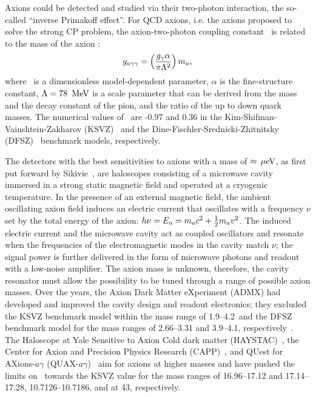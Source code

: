 Axions could be detected and studied via their two-photon interaction, the
so-called ``inverse Primakoff effect''. For QCD axions, i.e. the axions 
proposed to solve the strong CP problem, the axion-two-photon coupling 
constant \bgagg\ is related to the mass of the axion \ma: 
\begin{equation}
 g_{a\gamma\gamma} = \left(\frac{g_{\gamma}\alpha}{\pi \Lambda^2}\right)m_a, 
\label{eq:grelation}
\end{equation}
where \bggamma\ is a dimensionless model-dependent parameter, $\alpha$ is the 
fine-structure constant, $\Lambda=78~\,\text{Me\hspace{-.08em}V}$ is a scale parameter that can 
be derived from the mass and the decay constant of the pion, and the ratio of 
the up to down quark masses. 
The numerical values of \bggamma\ are -0.97 and 0.36 
in the Kim-Shifman-Vainshtein-Zakharov (KSVZ)~\cite{KSVZI,KSVZII} and 
the Dine-Fischler-Srednicki-Zhitnitsky (DFSZ)~\cite{DFSZI,DFSZII} benchmark 
models, respectively. 
%
%
% 

The detectors with the best sensitivities to axions with a mass of 
$\approx \,\mu\text{e\hspace{-.08em}V}$, as first put forward by 
Sikivie~\cite{SikivieI,SikivieII},  
are haloscopes consisting of a microwave cavity immersed in a strong static 
magnetic field and operated at a cryogenic temperature. 
In the presence of an external magnetic field, the ambient 
oscillating axion field induces an electric current that oscillates with 
a frequency $\nu$ set by the total energy of the axion: 
$h\nu=E_a=m_a c^2 + \frac{1}{2}m_a v^2$. The induced electric current 
and the microwave cavity act as coupled oscillators and resonate when the 
frequencies of the electromagnetic modes in the cavity match $\nu$; the signal 
power is further delivered in the form of microwave photons and 
readout with a low-noise amplifier. The axion mass is unknown, therefore, 
the cavity resonator must allow the possibility to be tuned through a range
of possible axion masses. Over the years, 
the Axion Dark Matter eXperiment (ADMX) had developed and improved the 
cavity design and readout electronics; they excluded the KSVZ 
benchmark model within the mass range of %
1.9--4.2\muevcc\ and the DFSZ benchmark model for the mass ranges 
of 2.66--3.31 and 3.9--4.1\muevcc, 
respectively~\cite{ADMXI,ADMXII,ADMXIII,ADMXIV,ADMXV,ADMXVI,ADMXVII}. 
The Haloscope at Yale Sensitive to Axion Cold dark matter 
(HAYSTAC)~\cite{HAYSTACI}, the 
Center for Axion and Precision Physics Research (CAPP)~\cite{CAPPI}, 
and QUest for AXions-$a\gamma$ (QUAX-$a\gamma$)~\cite{QUAX} aim for 
axions at higher masses and have pushed the limits on \gagg\ towards the 
KSVZ value for the mass ranges of 16.96--17.12 
and 17.14--17.28\muevcc, 10.7126--10.7186\muevcc, and at 43\muevcc, 
respectively. 

